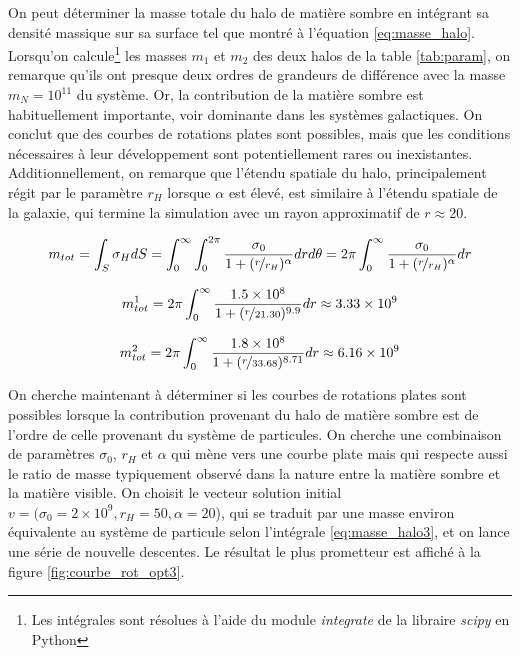 \documentclass{article}
\begin{document}
On peut déterminer la masse totale du halo de matière sombre en intégrant sa densité massique sur sa surface tel que montré à l'équation \ref{eq:masse_halo}. Lorsqu'on calcule\footnote{Les intégrales sont résolues à l'aide du module \textit{integrate} de la libraire \textit{scipy} en Python} les masses $m_1$ et $m_2$ des deux halos de la table \ref{tab:param}, on remarque qu'ils ont presque deux ordres de grandeurs de différence avec la masse $m_{N}=10^{11}$ du système. Or, la contribution de la matière sombre est habituellement importante, voir dominante dans les systèmes galactiques. On conclut que des courbes de rotations plates sont possibles, mais que les conditions nécessaires à leur développement sont potentiellement rares ou inexistantes.  Additionnellement, on remarque que l'étendu spatiale du halo, principalement régit par le paramètre $r_H$ lorsque $\alpha$ est élevé, est similaire à l'étendu spatiale de la galaxie, qui termine la simulation avec un rayon approximatif de $r \approx 20$.

\begin{equation}\label{eq:masse_halo}
	m_{tot} = \int_S \sigma_H dS= \int_{0}^{\infty} \int_{0}^{2 \pi} \frac{\sigma_0}{1+(\nicefrac{r}{r_H})^{\alpha}} dr d\theta = 2 \pi \int_{0}^{\infty} \frac{\sigma_0}{1+(\nicefrac{r}{r_H})^{\alpha}} dr
\end{equation}

\begin{equation}\label{eq:masse_halo1}
	m_{tot}^1 = 2 \pi \int_{0}^{\infty} \frac{1.5 \times 10^8}{1+(\nicefrac{r}{21.30})^{9.9}} dr \approx 3.33 \times 10^9
\end{equation}

\begin{equation}\label{eq:masse_halo2}
	m_{tot}^2 = 2 \pi \int_{0}^{\infty} \frac{1.8 \times 10^8}{1+(\nicefrac{r}{33.68})^{8.71}} dr \approx 6.16 \times 10^9
\end{equation}


On cherche maintenant à déterminer si les courbes de rotations plates sont possibles lorsque la contribution provenant du halo de matière sombre est de l'ordre de celle provenant du système de particules. On cherche une combinaison de paramètres $\sigma_0$, $r_H$ et $\alpha$ qui mène vers une courbe plate mais qui respecte aussi le ratio de masse typiquement observé dans la nature entre la matière sombre et la matière visible. On choisit le vecteur solution initial $v=(\sigma_0=2\times 10^9, r_H=50, \alpha=20$), qui se traduit par une masse environ équivalente au système de particule selon l'intégrale \ref{eq:masse_halo3}, et on lance une série de nouvelle descentes. Le résultat le plus prometteur est affiché à la figure \ref{fig:courbe_rot_opt3}.
\end{document}
